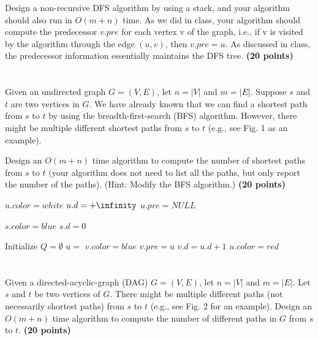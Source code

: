 \documentclass{article}
\begin{document}
Design a non-recursive DFS algorithm by using a stack, and your
algorithm should also run in $O(m + n)$ time. As we did in class, your  
algorithm should compute the predecessor $v.pre$ for each vertex v of
the graph, i.e., if v is visited by the algorithm through the edge
$(u, v)$, then $v.pre = u$. As discussed in class, the predecessor
information essentially maintains the DFS tree. {\bf (20 points) }








\section{}
Given an undirected graph $G = (V, E)$, let $n = |V|$ and $m
=|E|$. Suppose $s$ and $t$ are two vertices in $G$. We have already
known that we can find a shortest path from $s$ to $t$ by using the 
breadth-first-search (BFS) algorithm. However, there might be multiple  
different shortest paths from $s$ to $t$ (e.g., see Fig. 1 as an
example). 

Design an $O(m + n)$ time algorithm to compute the number of shortest
paths from $s$ to $t$ (your algorithm does not need to list all the
paths, but only report the number of the paths). (Hint: Modify the BFS 
algorithm.) {\bf (20 points) }



{\singlespacing
\begin{algorithmic}
      \State $u.color  = white$
      \State $u.d = +\infinity$
      \State $u.pre = NULL$
    \EndFor
    
    \State $s.color = blue$
    \State $s.d = 0$
    
    \State Initialize $Q = \emptyset$
    \State {}
      \State $u = $ 
          \State $v.color = blue$
          \State {}
          \State $v.pre = u$
          \State $v.d = u.d + 1$
        \EndIf
      \EndFor
      \State $u.color = red$
    \EndWhile
\EndFunction    
\end{algorithmic}
}


\section{}

Given a directed-acyclic-graph (DAG) $G = (V, E)$, let $n = |V|$ and
$m = |E|$. Let $s$ and $t$ be two vertices of $G$. There might be
multiple different paths (not necessarily shortest paths) from $s$ to
$t$ (e.g., see Fig. 2 for an example). Design an $O(m + n)$ time
algorithm to compute the number of different paths in $G$ from $s$ to
$t$. {\bf (20 points) }
\end{document}
